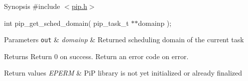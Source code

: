 \begin{DoxyParagraph}{Synopsis}
\#include $<$\hyperlink{pip_8h_source}{pip.\-h}$>$ \par
int pip\-\_\-get\-\_\-sched\-\_\-domain( pip\-\_\-task\-\_\-t $\ast$$\ast$domainp );
\end{DoxyParagraph}

\begin{DoxyParams}[1]{Parameters}
\mbox{\tt out}  & {\em domainp} & Returned scheduling domain of the current task\\
\hline
\end{DoxyParams}
\begin{DoxyReturn}{Returns}
Return 0 on success. Return an error code on error. 
\end{DoxyReturn}

\begin{DoxyRetVals}{Return values}
{\em E\-P\-E\-R\-M} & Pi\-P library is not yet initialized or already finalized \\
\hline
\end{DoxyRetVals}
